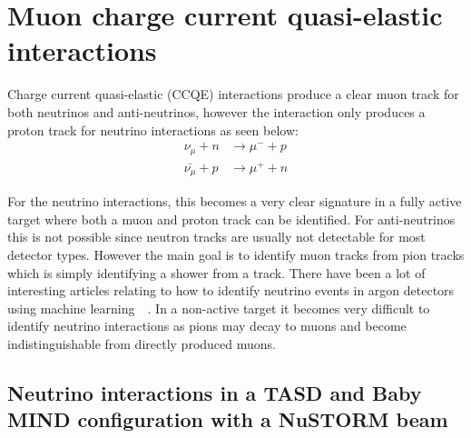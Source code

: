\section{Muon charge current quasi-elastic interactions}

Charge current quasi-elastic (CCQE) interactions produce a clear muon track for both neutrinos and anti-neutrinos, however the interaction only produces a proton track for neutrino interactions as seen below:
\begin{align}
\nu_\mu + n &\rightarrow \mu^- + p\\
 \bar{\nu_\mu} + p &\rightarrow \mu^+ + n
\end{align}

For the neutrino interactions, this becomes a very clear signature in a fully active target where both a muon and proton track can be identified. For anti-neutrinos this is not possible since neutron tracks are usually not detectable for most detector types. However the main goal is to identify muon tracks from pion tracks which is simply identifying a shower from a track. There have been a lot of interesting articles relating to how to identify neutrino events in argon detectors using machine learning~\cite{83Radovic2018}~\cite{84Adams}. In a non-active target it becomes very difficult to identify neutrino interactions as pions may decay to muons and become indistinguishable from directly produced muons.





\pagebreak
\subsection{Neutrino interactions in a TASD and Baby MIND configuration with a NuSTORM beam}


